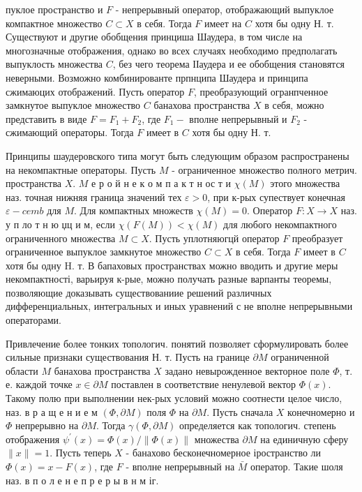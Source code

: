 \documentclass[10pt]{article}
\begin{document}
пуклое пространство и $F$ - непрерывный оператор, отображающий выпуклое компактное множество $C \subset X$ в себя. Тогда $F$ имеет на $C$ хотя бы одну Н. т. Существуют и другие обобщения принциша Шаудера, в том числе на многозначные отображения, однако во всех случаях необходимо предполагать выпуклость множества $C$, без чего теорема ІІаудера и ее обобщения становятся неверными. Возможно комбинированте прпнципа Шаудера и принципа сжимаюцих отображений. Пусть оператор $F$, преобразующий огранпченное замкнутое выпуклое множество $C$ банахова пространства $X$ в себя, можно представить в виде $F=F_{1}+F_{2}$, где $F_{1}-$ вполне непрерывный и $F_{2}$ - сжимающий операторы. Тогда $F$ имеет в $C$ хотя бы одну Н. т.



Принципы шаудеровского типа могут быть следующим образом распространены на некомпактные операторы. Пусть $M$ - ограниченное множество полного метрич. пространства $X$. $M$ е р о й н е к о м п а к т н ос т и $\chi(M)$ этого множества наз. точная нижняя граница значений тех $\varepsilon>0$, при к-рых супествует конечная $\varepsilon-c e m b$ для $M$. Для компактных множеств $\chi(M)=0$. Оператор $F: X \rightarrow X$ наз. у п ло т н ю џц и м, если $\chi(F(M))<\chi(M)$ для любого некомпактного ограниченного множества $M \subset X$. Пусть уплотняюгцй оператор $F$ преобразует ограниченное выпуклое замкнутое множество $C \subset X$ в себя. Тогда $F$ имеет в $C$ хотя бы одну H. т. В бапаховых пространствах можно вводить и другие меры некомпактності, варьируя к-рые, можно получать разные варпанты теоремы, позволяющие доказывать существованиие решений различных дифференциальных, интегральных и иных уравнений с не вполне непрерывными операторами.



Привлечение более тонких топологич. понятий позволяет сформулировать более сильные признаки существования Н. т. Пусть на границе $\partial M$ ограниченной области $M$ банахова пространства $X$ задано невырожденное векторное поле $\Phi$, т. е. каждой точке $x \in \partial M$ поставлен в соответствие ненулевой вектор $\Phi(x)$. Такому полю при выполнении нек-рых условий можно соотнести целое число, наз. в р а щ е н и е м $\mathcal{}(\Phi, \partial M)$ поля $\Phi$ на $\partial M$. Пусть сначала $X$ конечномерно и $\Phi$ непрерывно на $\partial M$. Тогда $\gamma(\Phi, \partial M)$ определяется как топологич. степень отображения $\psi^{\prime}(x)=\Phi(x) /\|\Phi(x)\|$ множества $\partial M$ на единичную сферу $\|x\|=1$. Пусть теперь $X$ - банахово бесконечномерное іространство ли $\Phi(x)=x-F(x)$, где $F$ - вполне непрерывный на $\bar{M}$ оператор. Такие шоля наз. в п о л е н е п р е р ы в н м іг.
\end{document}
